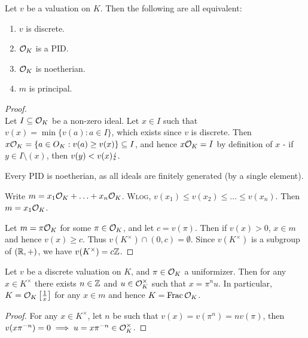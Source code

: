 \documentclass[10pt,a4paper]{article}
\begin{document}
\begin{lemma}
  Let $v$ be a valuation on $K$. Then the following are all equivalent:
  \begin{enumerate}
    \item $v$ is discrete.
    \item $\mathcal{O}_K$ is a PID.
    \item $\mathcal{O}_K$ is noetherian.
    \item $m$ is principal.
  \end{enumerate}
\end{lemma}
\begin{proof}\hspace*{0cm}\\
     Let $I\subseteq \mathcal{O}_K$ be a non-zero ideal. Let $x \in I$ such that $v(x) = \min\{v(a) : a \in I\}$, which exists since $v$ is discrete. Then $x \mathcal{O}_K = \{a \in O_K : v(a) \geq v(x) \} \subseteq I$, and hence $x\mathcal{O}_K = I$ by definition of $x$ - if $y \in I\setminus (x)$, then $v(y) < v(x) \lightning.$

     Every PID is noetherian, as all ideals are finitely generated (by a single element).

     Write $m = x_1\mathcal{O}_K + \ldots + x_n\mathcal{O}_K$. \textsc{Wlog}, $v(x_1) \leq v(x_2) \leq\ldots\leq v(x_n)$. Then $m = x_1\mathcal{O}_K$.

     Let $m=\pi\mathcal{O}_K$ for some $\pi\in\mathcal{O}_K$, and let $c = v(\pi)$. Then if $v(x) > 0$, $x \in m$ and hence $v(x) \geq c$. Thus $v(K^\times)\cap(0, c) = \emptyset$. Since $v(K^\times)$ is a subgroup of $(\mathbb{R}, +)$, we have $v(K^\times) = c\mathbb{Z}$.
\end{proof}
\begin{lemma}
  Let $v$ be a discrete valuation on $K$, and $\pi \in \mathcal{O}_K$ a uniformizer. Then for any $x \in K^\times$ there exists $n \in \mathbb{Z}$ and $u \in \mathcal{O}_K^\times$ such that $x = \pi^n u$. In particular, $K = \mathcal{O}_K\left[\frac{1}{x}\right]$ for any $x \in m$ and hence $K = \operatorname{Frac} \mathcal{O}_K$.
\end{lemma}
\begin{proof}
  For any $x \in K^\times$, let $n$ be such that $v(x) = v(\pi^n) = nv(\pi)$, then $v(x\pi^{-n}) = 0 \implies u = x\pi^{-n}\in \mathcal{O}_K^\times$.
\end{proof}
\end{document}
